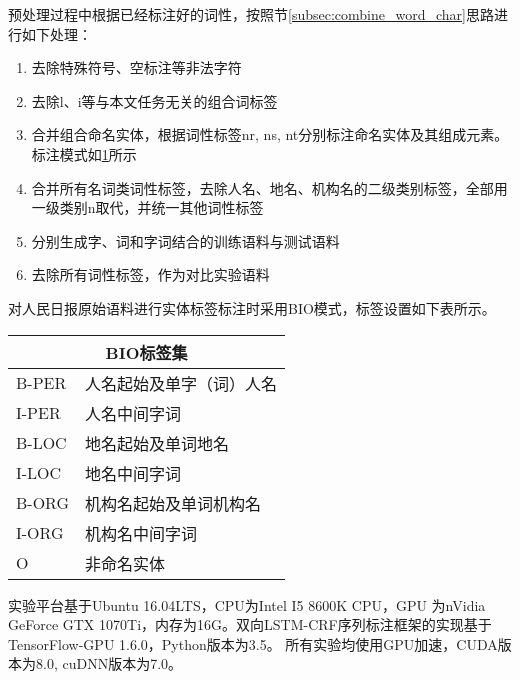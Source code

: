 预处理过程中根据已经标注好的词性，按照节\ref{subsec:combine_word_char}思路进行如下处理：
\begin{enumerate}[leftmargin=*]
    \item 去除特殊符号、空标注等非法字符
    \item 去除l、i等与本文任务无关的组合词标签
    \item 合并组合命名实体，根据词性标签nr, ns, nt分别标注命名实体及其组成元素。标注模式如\ref{tab:label_schema}所示
    \item 合并所有名词类词性标签，去除人名、地名、机构名的二级类别标签，全部用一级类别n取代，并统一其他词性标签
    \item 分别生成字、词和字词结合的训练语料与测试语料
    \item 去除所有词性标签，作为对比实验语料
\end{enumerate}

对人民日报原始语料进行实体标签标注时采用BIO模式，标签设置如下表所示。

\begin{table}[H]
    \centering
    \begin{tabular}{ll}
        \toprule
        \multicolumn{2}{c}{BIO标签集}\\
        \midrule
        B-PER & 人名起始及单字（词）人名 \\
        I-PER & 人名中间字词 \\
        B-LOC & 地名起始及单词地名 \\
        I-LOC & 地名中间字词 \\
        B-ORG & 机构名起始及单词机构名 \\
        I-ORG & 机构名中间字词 \\
        O & 非命名实体\\
        \bottomrule
    \end{tabular}
    \label{tab:label_schema}
\end{table}

实验平台基于Ubuntu 16.04LTS，CPU为Intel I5 8600K CPU，GPU 为nVidia GeForce GTX 1070Ti，内存为16G。双向LSTM-CRF序列标注框架的实现基于TensorFlow-GPU 1.6.0，Python版本为3.5。
所有实验均使用GPU加速，CUDA版本为8.0, cuDNN版本为7.0。

